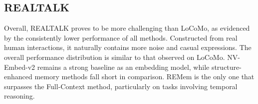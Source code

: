 \documentclass{article} %
\newcommand{\ours}{REMem\xspace}
\begin{document}
\subsection{REALTALK}
\label{subsec:results-on-realtalk}


Overall, REALTALK proves to be more challenging than LoCoMo, as evidenced by the consistently lower performance of all methods. Constructed from real human interactions, it naturally contains more noise and casual expressions.
The overall performance distribution is similar to that observed on LoCoMo. NV-Embed-v2 remains a strong baseline as an embedding model, while structure-enhanced memory methods fall short in comparison.
\ours is the only one that surpasses the Full-Context method, particularly on tasks involving temporal reasoning.
\end{document}
